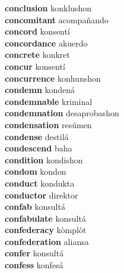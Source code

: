 \textbf{conclusion } konklushon \\
\textbf{concomitant } acompañando \\
\textbf{concord } konsentí \\
\textbf{concordance } akuerdo \\
\textbf{concrete } konkret \\
\textbf{concur } konsentí \\
\textbf{concurrence } konhunshon \\
\textbf{condemn } kondená \\
\textbf{condemnable } kriminal \\
\textbf{condemnation } desaprobashon \\
\textbf{condensation } resúmen \\
\textbf{condense } destilá \\
\textbf{condescend } baha \\
\textbf{condition } kondishon \\
\textbf{condom } kondon \\
\textbf{conduct } kondukta \\
\textbf{conductor } direktor \\
\textbf{confab } konsultá \\
\textbf{confabulate } konsultá \\
\textbf{confederacy } kòmplòt \\
\textbf{confederation } aliansa \\
\textbf{confer } konsultá \\
\textbf{confess } konfesá \\
